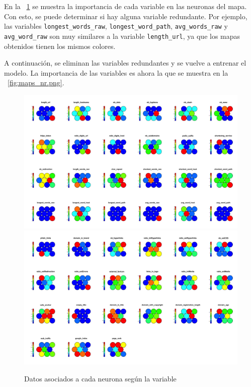 \documentclass[12pt, a4paper]{article}
\newcommand*{\figref}[1]{\figurename~\ref{fig:#1}}
\begin{document}
      En la \figref{maps.png} se muestra la importancia de cada variable en las neuronas del mapa. Con esto, se puede determinar si hay alguna variable redundante. Por ejemplo, las variables \texttt{longest\_words\_raw}, \texttt{longest\_word\_path}, \texttt{avg\_words\_raw} y \texttt{avg\_word\_raw} son muy similares a la variable \texttt{length\_url}, ya que los mapas obtenidos tienen los mismos colores.

      A continuación, se eliminan las variables redundantes y se vuelve a entrenar el modelo. La importancia de las variables es ahora la que se muestra en la \figref{maps_nr.png}.

      \begin{figure}[H]
        \centering
        \includegraphics[width=1\textwidth]{maps1.png}
        \includegraphics[width=1\textwidth]{maps2.png}
        \caption{Datos asociados a cada neurona según la variable}
        \label{fig:maps.png}
      \end{figure}
\end{document}
